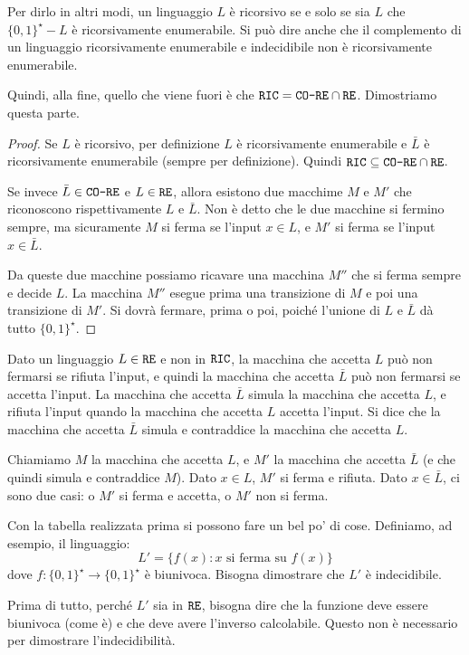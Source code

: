 Per dirlo in altri modi, un linguaggio $L$ \`e ricorsivo se e solo se sia $L$ che $\{0,1\}^{\star} - L$ \`e ricorsivamente enumerabile. Si pu\`o dire anche che il complemento di un linguaggio ricorsivamente enumerabile e indecidibile non \`e ricorsivamente enumerabile.

Quindi, alla fine, quello che viene fuori \`e che $\texttt{RIC} = \texttt{CO-RE} \cap \texttt{RE}$. Dimostriamo questa parte.

\begin{proof}
Se $L$ \`e ricorsivo, per definizione $L$ \`e ricorsivamente enumerabile e $\bar{L}$ \`e ricorsivamente enumerabile (sempre per definizione). Quindi $\texttt{RIC} \subseteq \texttt{CO-RE} \cap \texttt{RE}$.

Se invece $\bar{L} \in \texttt{CO-RE}$ e $L \in \texttt{RE}$, allora esistono due macchime $M$ e $M'$ che riconoscono rispettivamente $L$ e $\bar{L}$. Non \`e detto che le due macchine si fermino sempre, ma sicuramente $M$ si ferma se l'input $x \in L$, e $M'$ si ferma se l'input $x \in \bar{L}$.

Da queste due macchine possiamo ricavare una macchina $M''$ che si ferma sempre e decide $L$. La macchina $M''$ esegue prima una transizione di $M$ e poi una transizione di $M'$. Si dovr\`a fermare, prima o poi, poich\'e l'unione di $L$ e $\bar{L}$ d\`a tutto $\{0,1\}^{\star}$.
\end{proof}

Dato un linguaggio $L \in \texttt{RE}$ e non in $\texttt{RIC}$, la macchina che accetta $L$ pu\`o non fermarsi se rifiuta l'input, e quindi la macchina che accetta $\bar{L}$ pu\`o non fermarsi se accetta l'input. La macchina che accetta $\bar{L}$ simula la macchina che accetta $L$, e rifiuta l'input quando la macchina che accetta $L$ accetta l'input. Si dice che la macchina che accetta $\bar{L}$ simula e contraddice la macchina che accetta $L$.

Chiamiamo $M$ la macchina che accetta $L$, e $M'$ la macchina che accetta $\bar{L}$ (e che quindi simula e contraddice $M$). Dato $x \in L$, $M'$ si ferma e rifiuta. Dato $x \in \bar{L}$, ci sono due casi: o $M'$ si ferma e accetta, o $M'$ non si ferma.

Con la tabella realizzata prima si possono fare un bel po' di cose. Definiamo, ad esempio, il linguaggio:
\[
L' = \{ f(x) : x \text{ si ferma su } f(x) \}
\]
dove $f : \{0,1\}^{\star} \to \{0,1\}^{\star}$ \`e biunivoca. Bisogna dimostrare che $L'$ \`e indecidibile.

Prima di tutto, perch\'e $L'$ sia in $\texttt{RE}$, bisogna dire che la funzione deve essere biunivoca (come \`e) e che deve avere l'inverso calcolabile. Questo non \`e necessario per dimostrare l'indecidibilit\`a.

